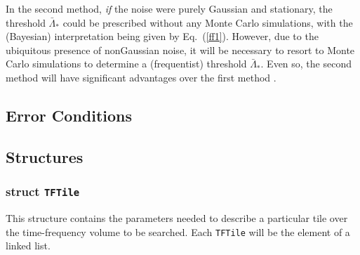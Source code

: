In the second method, {\it if} the noise were purely Gaussian and
stationary, the threshold ${\bar \Lambda}_*$ could be prescribed 
without any Monte Carlo simulations, with the (Bayesian)
interpretation being given by Eq.\ (\ref{ff1}).  However, due to the
ubiquitous presence of nonGaussian noise, it will be necessary to
resort to Monte Carlo simulations to determine a (frequentist)
threshold ${\bar \Lambda}_*$.  Even so, the second method will have
significant advantages over the first method \cite{abcf:2000}. 
 


\subsection*{Error Conditions}


\subsection*{Structures}

\subsubsection*{struct \texttt{TFTile}}

\noindent This structure contains the parameters needed to describe a
particular tile over the time-frequency volume to be searched.  Each
\verb+TFTile+ will be the element of a linked list. 

